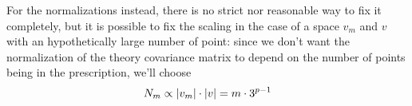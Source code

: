 For the normalizations instead, there is no strict nor reasonable way to fix it
completely, but it is possible to fix the scaling in the case of a space
$v_m$ and $v$ with an hypothetically large number of point: since we don't want
the normalization of the theory covariance matrix to depend on the number of
points being in the prescription, we'll choose
\begin{equation}
    \label{eq:mhou/prescr/N-norm}
    N_m \propto \abs{v_m} \cdot \abs{v} = m \cdot 3^{p-1}
\end{equation}

